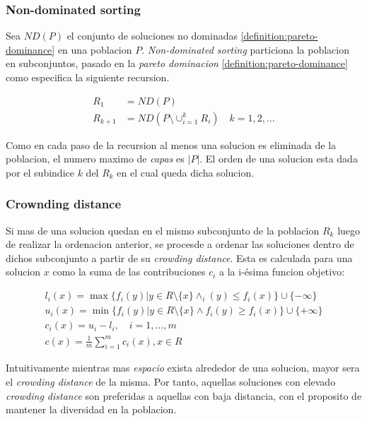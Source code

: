 
\subsubsection{Non-dominated sorting}\label{section:ndsorting}

Sea $ND(P)$ el conjunto de soluciones no dominadas \ref{definition:pareto-dominance} en una poblacion $P$. \emph{Non-dominated sorting} particiona la poblacion en subconjuntos, pasado en la \emph{pareto dominacion} \ref{definition:pareto-dominance} como especifica la siguiente recursion.

\begin{align}
    R_1 &= ND(P) \\
    R_{k+1} &= ND(P \setminus \cup_{i=1}^k R_i) \quad k = 1,2, \dots
\end{align}

Como en cada paso de la recursion al menos una solucion es eliminada de la poblacion, el numero maximo de \emph{capas} es $|P|$. El orden de una solucion esta dada por el subindice $k$ del $R_k$ en el cual queda dicha solucion.

\subsubsection{Crownding distance}\label{section:crowding-distance}

Si mas de una solucion quedan en el mismo subconjunto de la poblacion $R_k$ luego de realizar la ordenacion anterior, se procesde a ordenar las soluciones dentro de dichos subconjunto a partir de su \emph{crowding distance}. Esta es calculada para una solucion $x$ como la suma de las contribuciones $c_i$ a la i-\'esima funcion objetivo:

\begin{align}
    l_i(x) = \max \{ f_i(y) | y \in R \setminus \{x\} \wedge_i(y) \leq f_i(x) \} \cup \{-\infty\} \\
    u_i(x) = \min \{ f_i(y) | y \in R \setminus \{x\} \wedge f_i(y) \geq f_i(x) \} \cup \{+\infty\} \\
    c_i(x) = u_i - l_i, \quad i = 1, \dots, m \\
    c(x)   = \frac{1}{m} \sum_{i=1}^m c_i(x), x \in R
\end{align}

Intuitivamente mientras mas \textit{espacio} exista alrededor de una solucion, mayor sera el \emph{crowding distance} de la misma. Por tanto, aquellas soluciones con elevado \emph{crowding distance} son preferidas a aquellas con baja distancia, con el proposito de mantener la diversidad en la poblacion.

